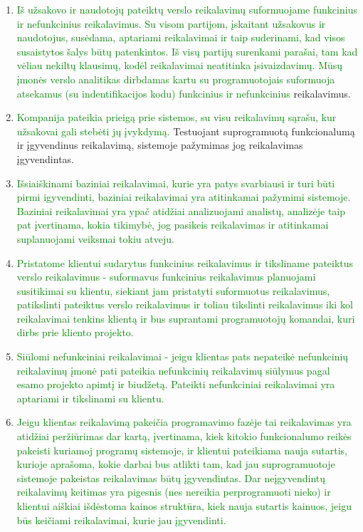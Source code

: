 \documentclass{VUMIFPSkursinis}
\begin{document}
	\begin{enumerate}
		\item{
			\textcolor{green}{Iš užsakovo ir naudotojų pateiktų verslo reikalavimų suformuojame funkcinius ir nefunkcinius reikalavimus.
			Su visom partijom, įskaitant užsakovus ir naudotojus, susėdama, aptariami reikalavimai ir taip suderinami, kad visos susaistytos šalys būtų patenkintos.
			Iš visų partijų surenkami parašai, tam kad vėliau nekiltų klausimų, kodėl reikalavimai neatitinka įsivaizdavimų.
			Mūsų įmonės verslo analitikas dirbdamas kartu su programuotojais suformuoja atsekamus (su indentifikacijos kodu) funkcinius ir nefunkcinius} reikalavimus.
		}
		\item{
			\textcolor{green}{Kompanija pateikia prieigą prie sistemos, su visu reikalavimų sąrašu, kur užsakovai gali stebėti jų įvykdymą.}
			Testuojant suprogramuotą funkcionalumą ir įgyvendinus reikalavimą, sistemoje pažymimas jog reikalavimas įgyvendintas.
		}
		\item{
			\textcolor{green}{Išsiaiškinami baziniai reikalavimai, kurie yra patys svarbiausi ir turi būti pirmi igyvendinti, baziniai reikalavimai yra atitinkamai pažymimi sistemoje.
			Baziniai reikalavimai yra ypač atidžiai analizuojami analistų, analizėje taip pat įvertinama, kokia tikimybė, jog pasikeis reikalavimas ir atitinkamai suplanuojami veiksmai tokiu atveju.}
		}
		\item{
				\textcolor{green}{Pristatome klientui sudarytus funkcinius reikalavimus ir tiksliname pateiktus verslo reikalavimus - suformavus funkcinius reikalavimus planuojami susitikimai su klientu, siekiant jam pristatyti suformuotus reikalavimus, patikslinti pateiktus verslo reikalavimus ir toliau tikslinti reikalavimus iki kol reikalavimai tenkins klientą ir bus suprantami programuotojų komandai, kuri dirbs prie kliento projekto.}
		}
		\item{
			\textcolor{green}{Siūlomi nefunkciniai reikalavimai - jeigu klientas pats nepateikė nefunkcinių reikalavimų įmonė pati pateikia nefunkcinių reikalavimų siūlymus pagal esamo projekto apimtį ir biudžetą.
			Pateikti nefunkciniai reikalavimai yra aptariami ir tikslinami su klientu.}
		}
		\item{
			\textcolor{green}{Jeigu klientas reikalavimą pakeičia programavimo fazėje tai reikalavimas yra atidžiai peržiūrimas dar kartą, įvertinama, kiek kitokio funkcionalumo reikės pakeisti kuriamoj programų sistemoje, ir klientui pateikiama nauja sutartis, kurioje aprašoma, kokie darbai bus atlikti tam, kad jau suprogramuotoje sistemoje pakeistas reikalavimas būtų įgyvendintas.
			Dar neįgyvendintų reikalavimų keitimas yra pigesnis (nes nereikia perprogramuoti nieko) ir klientui aiškiai išdėstoma kainos struktūra, kiek nauja sutartis kainuos, jeigu būs keičiami reikalavimai, kurie jau įgyvendinti.}
		}
	\end{enumerate}
\end{document}
